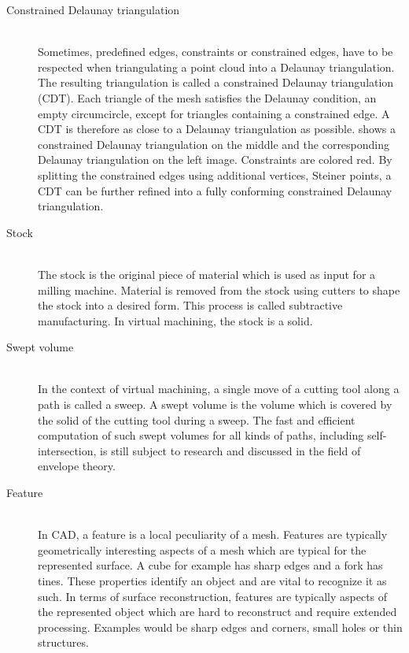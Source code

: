 \begin{description}
	\item[Constrained Delaunay triangulation] \hfill \\
	Sometimes, predefined edges, \ie constraints or constrained edges, have to be respected when triangulating a point cloud into a Delaunay triangulation.
	The resulting triangulation is called a constrained Delaunay triangulation (CDT).
	Each triangle of the mesh satisfies the Delaunay condition, \ie an empty circumcircle, except for triangles containing a constrained edge.
	A CDT is therefore as close to a Delaunay triangulation as possible.
	 shows a constrained Delaunay triangulation on the middle and the corresponding Delaunay triangulation on the left image.
	Constraints are colored red.
	By splitting the constrained edges using additional vertices, \ie Steiner points, a CDT can be further refined into a fully conforming constrained Delaunay triangulation.


	\item[Stock] \hfill \\
	The stock is the original piece of material which is used as input for a milling machine.
	Material is removed from the stock using cutters to shape the stock into a desired form.
	This process is called subtractive manufacturing.
	In virtual machining, the stock is a solid.


	\item[Swept volume] \hfill \\
	In the context of virtual machining, a single move of a cutting tool along a path is called a sweep.
	A swept volume is the volume which is covered by the solid of the cutting tool during a sweep.
	The fast and efficient computation of such swept volumes for all kinds of paths, including self-intersection, is still subject to research and discussed in the field of envelope theory.


	\item[Feature] \hfill \\
	In CAD, a feature is a local peculiarity of a mesh.
	Features are typically geometrically interesting aspects of a mesh which are typical for the represented surface.
	A cube for example has sharp edges and a fork has tines.
	These properties identify an object and are vital to recognize it as such.
	In terms of surface reconstruction, features are typically aspects of the represented object which are hard to reconstruct and require extended processing.
	Examples would be sharp edges and corners, small holes or thin structures.

\end{description}

